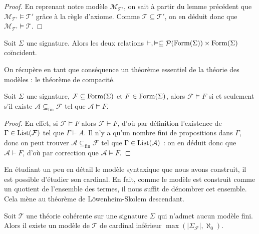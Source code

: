 \begin{proof}
  En reprenant notre modèle $\mathcal M_{\mathcal T'}$, on sait à partir du lemme
  précédent que $\mathcal M_{\mathcal T'}\models \mathcal T'$ grâce à la règle
  d'axiome. Comme $\mathcal T\subseteq\mathcal T'$, on en déduit donc que
  $\mathcal M_{\mathcal T'}\models \mathcal T$.
\end{proof}

\begin{theorem}\label{thm.completude}
  Soit $\Sigma$ une signature. Alors les deux relations
  $\vdash,\vDash\subseteq \mathcal{P}(\operatorname{Form}(\Sigma))\times\operatorname{Form}(\Sigma)$
  coïncident.
\end{theorem}

On récupère en tant que conséquence un théorème essentiel de la théorie des
modèles : le théorème de compacité.

\begin{theorem}
  Soit $\Sigma$ une signature, $\mathcal F \subseteq\operatorname{Form}(\Sigma)$ et
  $F\in\operatorname{Form}(\Sigma)$, alors $\mathcal F\vDash F$ si et seulement s'il existe
  $\mathcal A\subseteq_{\mathrm{fin}} \mathcal F$ tel que
  $\mathcal A\vDash F$.
\end{theorem}

\begin{proof}
  En effet, si $\mathcal F\vDash F$ alors $\mathcal F\vdash F$, d'où par
  définition l'existence de $\Gamma\in\operatorname{List}(\mathcal F)$ tel que
  $\Gamma\vdash A$. Il n'y a qu'un nombre fini de propositions dans $\Gamma$,
  donc on peut trouver $\mathcal A\subseteq_{\mathrm{fin}}\mathcal F$ tel que
  $\Gamma\in\operatorname{List}(\mathcal A)$ : on en déduit donc que $\mathcal A\vdash F$,
  d'où par correction que $\mathcal A\vDash F$.
\end{proof}

En étudiant un peu en détail le modèle syntaxique que nous avons construit, il
est possible d'étudier son cardinal. En fait, comme le modèle est construit
comme un quotient de l'ensemble des termes, il nous suffit de dénombrer cet
ensemble. Cela mène au théorème de Löwenheim-Skolem descendant.

\begin{theorem}
  Soit $\mathcal T$ une théorie cohérente sur une signature $\Sigma$ qui
  n'admet aucun modèle fini. Alors il existe un modèle de $\mathcal T$ de
  cardinal inférieur $\max(|\Sigma_{\mathcal F}|,\aleph_0)$.
\end{theorem}

